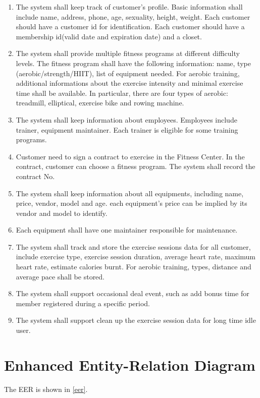 \documentclass[12pt,letterpaper,titlepage,en-US]{article}
\begin{document}
\begin{enumerate}
    \item The system shall keep track of customer’s profile. Basic information shall include name, address, phone, age, sexuality, height, weight. Each customer should have a customer id for identification. Each customer should have a membership id(valid date and expiration date) and a closet.
    \item The system shall provide multiple fitness programs at different difficulty levels. The fitness program shall have the following information: name, type (aerobic/strength/HIIT), list of equipment needed. For aerobic training, additional informations about the exercise intensity and minimal exercise time shall be available. In particular, there are four types of aerobic: treadmill, elliptical, exercise bike and rowing machine.
    \item The system shall keep information about employees. Employees include trainer, equipment maintainer. Each trainer is eligible for some training programs.
    \item Customer need to sign a contract to exercise in the Fitness Center. In the contract, customer can choose a fitness program. The system shall record the contract No.
    \item The system shall keep information about all equipments, including name, price, vendor, model and age. each equipment's price can be implied by its vendor and model to identify.
    \item Each equipment shall have one maintainer responsible for maintenance.
    \item The system shall track and store the exercise sessions data for all customer, include exercise type, exercise session duration, average heart rate, maximum heart rate, estimate calories burnt. For aerobic training, types, distance and average pace shall be stored.
    \item The system shall support occasional deal event, such as add bonus time for member registered during a specific period.
    \item The system shall support clean up the exercise session data for long time idle user.
\end{enumerate}

\pagebreak
\section{Enhanced Entity-Relation Diagram}
The EER is shown in \cref{eer}.
\end{document}

